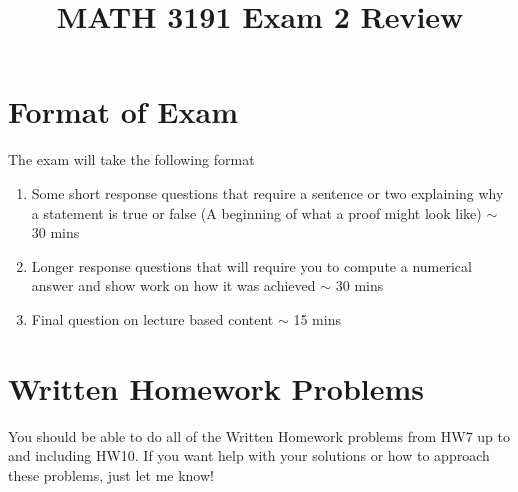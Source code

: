 \documentclass[12pt]{exam}
\title{MATH 3191 Exam 2 Review}
\date{}
\begin{document}
\maketitle
\section{Format of Exam}
The exam will take the following format
\begin{enumerate}
    \item Some short response questions that require a sentence or two explaining why a statement
        is true or false (A beginning of what a proof might look like) $\sim$ 30 mins 
    \item Longer response questions that will require you to compute a numerical answer and show work
        on how it was achieved $\sim$ 30 mins
    \item Final question on lecture based content $\sim$ 15 mins
\end{enumerate}
\section{Written Homework Problems}
You should be able to do all of the Written Homework problems from HW7 up to and including HW10. If you want
help with your solutions or how to approach these problems, just let me know!
\end{document}
